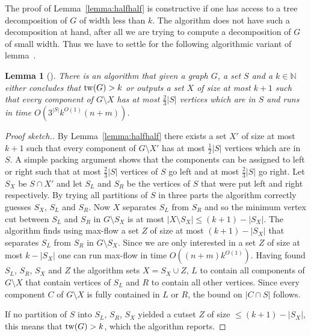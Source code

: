 \documentclass[a4paper,11pt]{article}
\newtheorem{lemma}{Lemma}[section]
\theoremstyle{definition}
\theoremstyle{remark}
\begin{document}
The proof of Lemma~\ref{lemma:halfhalf} is constructive if one has
access to a tree decomposition of $G$ of width less than $k$.  The
algorithm does not have such a decomposition at hand, after all we are
trying to compute a decomposition of $G$ of small width.  Thus we have
to settle for the following algorithmic variant of
lemma~\cite{RobertsonS2}.

\begin{lemma}[\cite{RobertsonS13}]
  \label{lem:halfhalfalg}
  There is an algorithm that given a graph $G$, a set $S$ and a $k \in
  \mathbb{N}$ either concludes that $\mathrm{tw}(G) > k$ or outputs a set $X$
  of size at most $k + 1$ such that every component of $G \setminus X$
  has at most $\frac{2}{3}|S|$ vertices which are in $S$ and runs in
  time $O(3^{|S|}k^{O(1)}(n + m))$.
\end{lemma}

\begin{proof}[Proof sketch.]
  By Lemma~\ref{lemma:halfhalf} there exists a set $X'$ of size at
  most $k+1$ such that every component of $G \setminus X'$ has at most
  $\frac{1}{2}|S|$ vertices which are in $S$.  A simple packing
  argument shows that the components can be assigned to left or right
  such that at most $\frac{2}{3}|S|$ vertices of $S$ go left and at
  most $\frac{2}{3}|S|$ go right.  Let $S_X$ be $S \cap X'$ and let
  $S_L$ and $S_R$ be the vertices of $S$ that were put left and right
  respectively.  By trying all partitions of $S$ in three parts the
  algorithm correctly guesses $S_X$, $S_L$ and $S_R$.  Now $X$
  separates $S_L$ from $S_R$ and so the minimum vertex cut between
  $S_L$ and $S_R$ in $G \setminus S_X$ is at most $|X \setminus S_X|
  \leq (k+1)-|S_X|$.  The algorithm finds using max-flow a set $Z$ of
  size at most $(k+1)-|S_X|$ that separates $S_L$ from $S_R$ in $G
  \setminus S_X$.  Since we are only interested in a set $Z$ of size
  at most $k-|S_X|$ one can run max-flow in time $O((n+m)k^{O(1)})$.
  Having found $S_L$, $S_R$, $S_X$ and $Z$ the algorithm sets $X = S_X
  \cup Z$, $L$ to contain all components of $G \setminus X$ that
  contain vertices of $S_L$ and $R$ to contain all other vertices.
  Since every component $C$ of $G \setminus X$ is fully contained in
  $L$ or $R$, the bound on $|C \cap S|$ follows.
  
  If no partition of $S$ into $S_L$, $S_R$, $S_X$ yielded a cutset $Z$
  of size $\leq (k+1)-|S_X|$, this means that $\mathrm{tw}(G)>k$, which the
  algorithm reports.
\end{proof}
\end{document}

